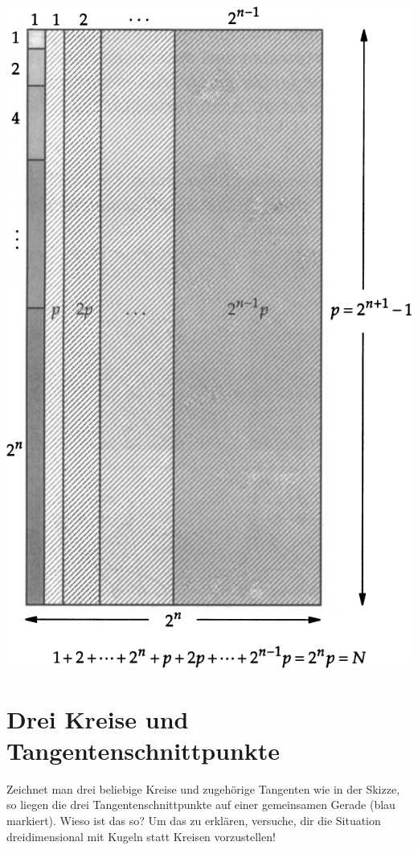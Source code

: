 \documentclass[a5paper,ngerman,landscape,11pt]{scrartcl}
\begin{document}
{\begin{vwcol}[widths={0.7,0.35},sep=1cm,rule=0pt,indent=0em,justify=flush]
\includegraphics[scale=0.45]{mersenne-perfekt}
\end{vwcol}}


\section*{Drei Kreise und Tangentenschnittpunkte}

Zeichnet man drei beliebige Kreise und zugehörige Tangenten wie in der Skizze,
so liegen die drei Tangentenschnittpunkte auf einer gemeinsamen Gerade (blau
markiert). Wieso ist das so? Um das zu erklären, versuche, dir die Situation
dreidimensional mit Kugeln statt Kreisen vorzustellen!
\end{document}

